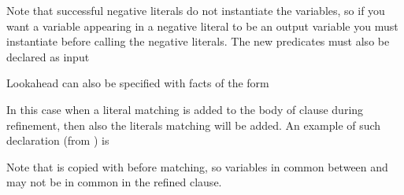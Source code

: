 \documentclass[letterpaper,10pt,english]{sphinxmanual}
\begin{document}
\sphinxAtStartPar
Note that successful negative literals do not instantiate the variables, so if you want a variable appearing in a negative literal to be an output variable you must instantiate before calling the negative literals.
The new predicates must also be declared as input

\begin{sphinxVerbatim}[commandchars=\\\{\}]
\end{sphinxVerbatim}

\sphinxAtStartPar
Lookahead can also be specified with facts of the form

\begin{sphinxVerbatim}[commandchars=\\\{\}]
  
\end{sphinxVerbatim}

\sphinxAtStartPar
In this case when a literal matching  is added to the body of clause during refinement, then also the literals matching  will be added. An example of such declaration (from ) is

\begin{sphinxVerbatim}[commandchars=\\\{\}]
\PYG{p}{[}\PYG{p}{]}
\end{sphinxVerbatim}

\sphinxAtStartPar
Note that  is copied with  before matching, so variables in common between  and  may not be in common in the refined clause.
\end{document}
